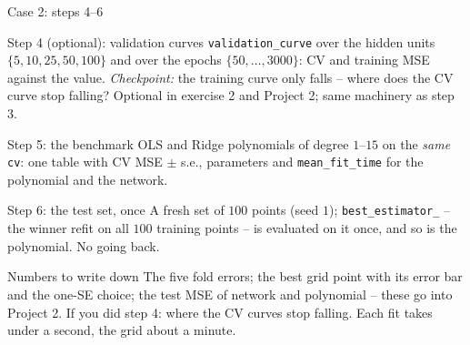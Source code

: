 \documentclass[10pt,aspectratio=169]{beamer}
\begin{document}
\begin{frame}{Case 2: steps 4--6}
\small
\begin{block}{Step 4 (optional): validation curves}
\texttt{validation\_curve} over the hidden units $\{5,10,25,50,100\}$ and
over the epochs $\{50,\dots,3000\}$: CV and training MSE against the
value.  \emph{Checkpoint:} the training curve only falls -- where does the
CV curve stop falling?  Optional in exercise 2 and Project 2; same
machinery as step 3.
\end{block}
\begin{block}{Step 5: the benchmark}
OLS and Ridge polynomials of degree $1$--$15$ on the \emph{same}
\texttt{cv}: one table with CV MSE $\pm$ s.e., parameters and
\texttt{mean\_fit\_time} for the polynomial and the network.
\end{block}
\begin{block}{Step 6: the test set, once}
A fresh set of $100$ points (seed $1$); \texttt{best\_estimator\_} -- the
winner refit on all $100$ training points -- is evaluated on it once, and
so is the polynomial.  No going back.
\end{block}
\begin{block}{Numbers to write down}
The five fold errors; the best grid point with its error bar and the
one-SE choice; the test MSE of network and polynomial -- these go into
Project 2.  If you did step 4: where the CV curves stop falling.  Each
fit takes under a second, the grid about a minute.
\end{block}
\end{frame}
\end{document}
